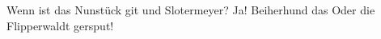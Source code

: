 \documentclass[12pt,a5paper]{article}
\begin{document}
\huge

Wenn ist das Nunstück git und Slotermeyer? Ja! Beiherhund das Oder die
Flipperwaldt gersput!
\end{document}
